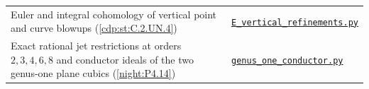 {\begin{longtable}{@{}>{\raggedright\arraybackslash}p{}>{\raggedright\arraybackslash}p{}@{}}
Euler and integral cohomology of vertical point and curve blowups (\cref{cdp:st:C.2.UN.4}) & \href{https://raw.githubusercontent.com/KokunoYumeto/s6-complex-structure-workbench/\SsixRepositoryCommit/pro_returns/S6_03_CDP_checkpoint_13_20261116T0136Z/S6_03_CDP/code/E_vertical_refinements.py}{\nolinkurl{E_vertical_refinements.py}} \\[3pt]
Exact rational jet restrictions at orders $2,3,4,6,8$ and conductor ideals of the two genus-one plane cubics (\cref{night:P4.14}) & \href{https://raw.githubusercontent.com/KokunoYumeto/s6-complex-structure-workbench/\SsixRepositoryCommit/pro_returns/S6_06_BLIND_checkpoint_15_20261117T1457Z/S6_06_BLIND/code/part4/genus_one_conductor.py}{\nolinkurl{genus_one_conductor.py}} \\[3pt]
\end{longtable}}

